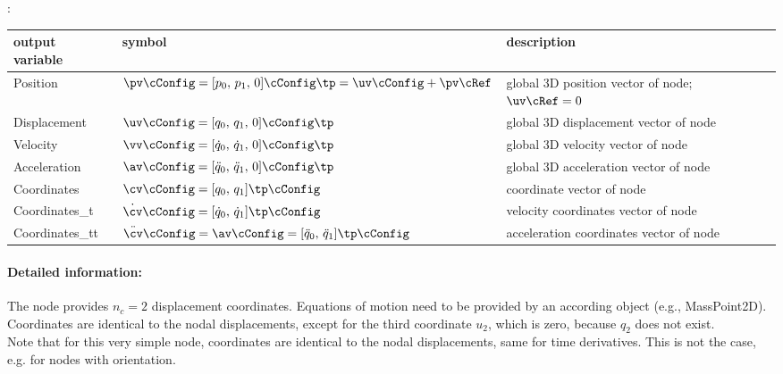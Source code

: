 :
\begin{center}
\footnotesize
\begin{longtable}{| p{5cm} | p{5cm} | p{6cm} |} 
\hline
\bf output variable & \bf symbol & \bf description \\ \hline
Position & $\pv\cConfig = [p_0,\,p_1,\,0]\cConfig\tp= \uv\cConfig + \pv\cRef$ & global 3D position vector of node; $\uv\cRef=0$\\ \hline
Displacement & $\uv\cConfig = [q_0,\,q_1,\,0]\cConfig\tp$ & global 3D displacement vector of node\\ \hline
Velocity & $\vv\cConfig = [\dot q_0,\,\dot q_1,\,0]\cConfig\tp$ & global 3D velocity vector of node\\ \hline
Acceleration & $\av\cConfig = [\ddot q_0,\,\ddot q_1,\,0]\cConfig\tp$ & global 3D acceleration vector of node\\ \hline
Coordinates & $\cv\cConfig = [q_0,\,q_1]\tp\cConfig$ &  coordinate vector of node\\ \hline
Coordinates\_t & $\dot\cv\cConfig = [\dot q_0,\,\dot q_1]\tp\cConfig$ &  velocity coordinates vector of node\\ \hline
Coordinates\_tt & $\ddot\cv\cConfig = \av\cConfig = [\ddot q_0,\,\ddot q_1]\tp\cConfig$ &  acceleration coordinates vector of node\\ \hline
\end{longtable}
\end{center}
 \noindent
    \paragraph{Detailed information:}
    The node provides $n_c=2$ displacement coordinates. Equations of motion need to be provided by an according object (e.g., MassPoint2D).
    Coordinates are identical to the nodal displacements, except for the third coordinate $u_2$, which is zero, because $q_2$ does not exist. \vspace{6pt}\\
    Note that for this very simple node, coordinates are identical to the nodal displacements, same for time derivatives. This is not the case, e.g. for nodes with orientation. \vspace{6pt}\\
    
